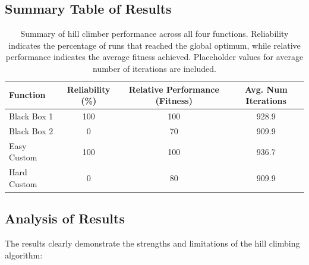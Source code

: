 \documentclass[11pt]{article}
\begin{document}
\subsection{Summary Table of Results}

\begin{table}[H]
\centering
\begin{tabular}{|l|c|c|c|}
\hline
\textbf{Function} & \textbf{Reliability (\%)} & \textbf{Relative Performance (Fitness)} & \textbf{Avg. Num Iterations} \\
\hline
Black Box 1 & 100 & 100 & 928.9 \\
Black Box 2 & 0 & 70 & 909.9 \\
Easy Custom & 100 & 100 & 936.7 \\
Hard Custom & 0 & 80 & 909.9 \\
\hline
\end{tabular}
\caption{Summary of hill climber performance across all four functions. Reliability indicates the percentage of runs that reached the global optimum, while relative performance indicates the average fitness achieved. Placeholder values for average number of iterations are included.}
\label{tab:results-summary}
\end{table}

\subsection{Analysis of Results}
The results clearly demonstrate the strengths and limitations of the hill climbing algorithm:
\end{document}

